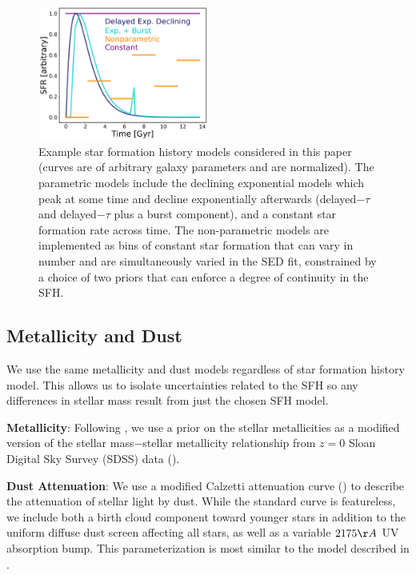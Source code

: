 \documentclass[twocolumn]{aastex62}
\begin{document}
\begin{figure}[h]

\centering
\includegraphics[width=0.5\textwidth]{sfh.png}\hfill

\caption{Example star formation history models considered in this paper (curves are of arbitrary galaxy parameters and are normalized). The parametric models include the declining exponential models which peak at some time and decline exponentially afterwards (delayed$-\tau$ and delayed$-\tau$ plus a burst component), and a constant star formation rate across time. The non-parametric models are implemented as bins of constant star formation that can vary in number and are simultaneously varied in the SED fit, constrained by a choice of two priors that can enforce a degree of continuity in the SFH. }
\label{fig:sfh_ex}

\end{figure}
 



\subsection{Metallicity and Dust}

We use the same metallicity and dust models regardless of star formation history model. This allows us to isolate uncertainties related to the SFH so any differences in stellar mass result from just the chosen SFH model. 

\textbf{Metallicity}: Following \cite{leja_older_2019}, we use a prior on the stellar metallicities as a modified version of the stellar mass$-$stellar metallicity relationship from $z = 0$ Sloan Digital Sky Survey (SDSS) data (\cite{gallazzi_ages_2005}). 

\textbf{Dust Attenuation}: We use a modified Calzetti attenuation curve (\cite{calzetti_dust_2001}) to describe the attenuation of stellar light by dust.  While the standard \citet{calzetti_dust_2001} curve is featureless, we include both a \cite{charlot_simple_2000} birth cloud component toward younger stars in addition to the uniform diffuse dust screen affecting all stars, as well as a variable $2175 \AA$ UV absorption bump. This parameterization is most similar to the model described in \cite{noll_analysis_2009}.   
\end{document}
